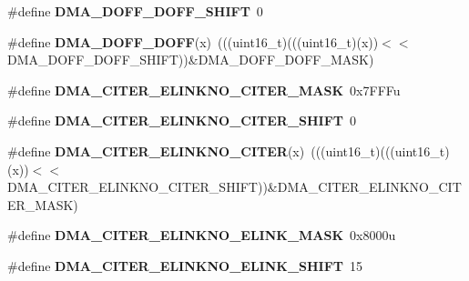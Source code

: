 \begin{DoxyCompactItemize}
\item 
\#define {\bfseries D\+M\+A\+\_\+\+D\+O\+F\+F\+\_\+\+D\+O\+F\+F\+\_\+\+S\+H\+I\+FT}~0\hypertarget{group__DMA__Register__Masks_gaeef657c3fd58c5d70e0d4934da146eb2}{}\label{group__DMA__Register__Masks_gaeef657c3fd58c5d70e0d4934da146eb2}

\item 
\#define {\bfseries D\+M\+A\+\_\+\+D\+O\+F\+F\+\_\+\+D\+O\+FF}(x)~(((uint16\+\_\+t)(((uint16\+\_\+t)(x))$<$$<$D\+M\+A\+\_\+\+D\+O\+F\+F\+\_\+\+D\+O\+F\+F\+\_\+\+S\+H\+I\+FT))\&D\+M\+A\+\_\+\+D\+O\+F\+F\+\_\+\+D\+O\+F\+F\+\_\+\+M\+A\+SK)\hypertarget{group__DMA__Register__Masks_ga7265c52e974590b80f54802562c12b40}{}\label{group__DMA__Register__Masks_ga7265c52e974590b80f54802562c12b40}

\item 
\#define {\bfseries D\+M\+A\+\_\+\+C\+I\+T\+E\+R\+\_\+\+E\+L\+I\+N\+K\+N\+O\+\_\+\+C\+I\+T\+E\+R\+\_\+\+M\+A\+SK}~0x7\+F\+F\+Fu\hypertarget{group__DMA__Register__Masks_ga2e735a50b1a3e8dd35e863ccb9932dc2}{}\label{group__DMA__Register__Masks_ga2e735a50b1a3e8dd35e863ccb9932dc2}

\item 
\#define {\bfseries D\+M\+A\+\_\+\+C\+I\+T\+E\+R\+\_\+\+E\+L\+I\+N\+K\+N\+O\+\_\+\+C\+I\+T\+E\+R\+\_\+\+S\+H\+I\+FT}~0\hypertarget{group__DMA__Register__Masks_ga8f8d80baa5e4e362665d8eb9781b09da}{}\label{group__DMA__Register__Masks_ga8f8d80baa5e4e362665d8eb9781b09da}

\item 
\#define {\bfseries D\+M\+A\+\_\+\+C\+I\+T\+E\+R\+\_\+\+E\+L\+I\+N\+K\+N\+O\+\_\+\+C\+I\+T\+ER}(x)~(((uint16\+\_\+t)(((uint16\+\_\+t)(x))$<$$<$D\+M\+A\+\_\+\+C\+I\+T\+E\+R\+\_\+\+E\+L\+I\+N\+K\+N\+O\+\_\+\+C\+I\+T\+E\+R\+\_\+\+S\+H\+I\+FT))\&D\+M\+A\+\_\+\+C\+I\+T\+E\+R\+\_\+\+E\+L\+I\+N\+K\+N\+O\+\_\+\+C\+I\+T\+E\+R\+\_\+\+M\+A\+SK)\hypertarget{group__DMA__Register__Masks_ga7f14dceacc2f8924097e69b1770cbff3}{}\label{group__DMA__Register__Masks_ga7f14dceacc2f8924097e69b1770cbff3}

\item 
\#define {\bfseries D\+M\+A\+\_\+\+C\+I\+T\+E\+R\+\_\+\+E\+L\+I\+N\+K\+N\+O\+\_\+\+E\+L\+I\+N\+K\+\_\+\+M\+A\+SK}~0x8000u\hypertarget{group__DMA__Register__Masks_ga97ca9c4d99839ee12bc10c712101038a}{}\label{group__DMA__Register__Masks_ga97ca9c4d99839ee12bc10c712101038a}

\item 
\#define {\bfseries D\+M\+A\+\_\+\+C\+I\+T\+E\+R\+\_\+\+E\+L\+I\+N\+K\+N\+O\+\_\+\+E\+L\+I\+N\+K\+\_\+\+S\+H\+I\+FT}~15\hypertarget{group__DMA__Register__Masks_ga70c898d132a15d1d18b5a2d5863188a3}{}\label{group__DMA__Register__Masks_ga70c898d132a15d1d18b5a2d5863188a3}


\end{DoxyCompactItemize}
